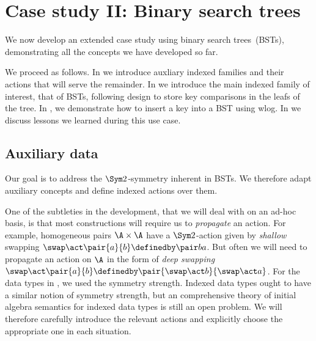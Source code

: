 \section{Case study II: Binary search trees}

We now develop an extended case study using binary search
trees~(BSTs), demonstrating all the concepts we have developed so far.

We proceed as follows. In  we introduce auxliary
indexed families and their actions that will serve the remainder.  In
 we introduce the main indexed family of interest,
that of BSTs, following  design
to store key comparisons in the leafs of the tree.  In
, we demonstrate how to insert a key into a BST
using wlog. In  we discuss lessons we learned
during this use case.

\subsection{Auxiliary data}
Our goal is to address the $\Sym2$-symmetry inherent in BSTs. We
therefore adapt  auxiliary
concepts and define indexed actions over them.

One of the subtleties in the development, that we will deal with on an
ad-hoc basis, is that most constructions will require us to
\emph{propagate} an action. For example, homogeneous pairs
$\A\times\A$ have a $\Sym 2$-action given by \emph{shallow} swapping
$\swap\act\pair{a}{b} \definedby \pair ba$. But often we will need to
propagate an action on $\A$ in the form of \emph{deep swapping}
$\swap\act\pair{a}{b} \definedby \pair{\swap \act b}{\swap \act
  a}$. For the data types in , we used the
symmetry strength. Indexed data types ought to have a similar notion
of symmetry strength, but an comprehensive theory of initial algebra
semantics for indexed data types is still an open problem. We will
therefore carefully introduce the relevant actions and explicitly
choose the appropriate one in each situation.


